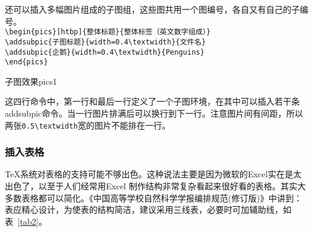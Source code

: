 还可以插入多幅图片组成的子图组，这些图共用一个图编号，各自又有自己的子编号。\\
\verb|\begin{pics}[htbp]{整体标题}{整体标签（英文数字组成）}|\\
\verb|\addsubpic{子图标题}{width=0.4\textwidth}{文件名}|\\
\verb|\addsubpic{企鹅}{width=0.4\textwidth}{Penguins}|\\
\verb|\end{pics}|\\
\begin{pics}[htbp]{子图效果}{pics1}
\end{pics}
这四行命令中，第一行和最后一行定义了一个子图环境，在其中可以插入若干条addsubpic命令。当一行图片排满后可以换行到下一行。注意图片间有间距，所以两张\verb|0.5\textwidth|宽的图片不能排在一行。\par
\subsubsection{插入表格}
\TeX 系统对表格的支持可能不够出色。这种说法主要是因为微软的Excel实在是太出色了，以至于人们经常用Excel 制作结构非常复杂看起来很好看的表格。其实大多数表格都可以简化。《中国高等学校自然科学学报编排规范(修订版)》中讲到：表应精心设计，为使表的结构简洁，建议采用三线表，必要时可加辅助线，如表~\ref{tab2}。

